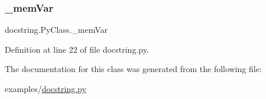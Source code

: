 \subsubsection{\texorpdfstring{\_memVar}{\_memVar}}
{\footnotesize\ttfamily docstring.\+Py\+Class.\+\_\+mem\+Var\hspace{0.3cm}{\ttfamily [private]}}



Definition at line 22 of file docstring.\+py.



The documentation for this class was generated from the following file\+:\begin{DoxyCompactItemize}
\item 
examples/\mbox{\hyperlink{docstring_8py}{docstring.\+py}}\end{DoxyCompactItemize}
